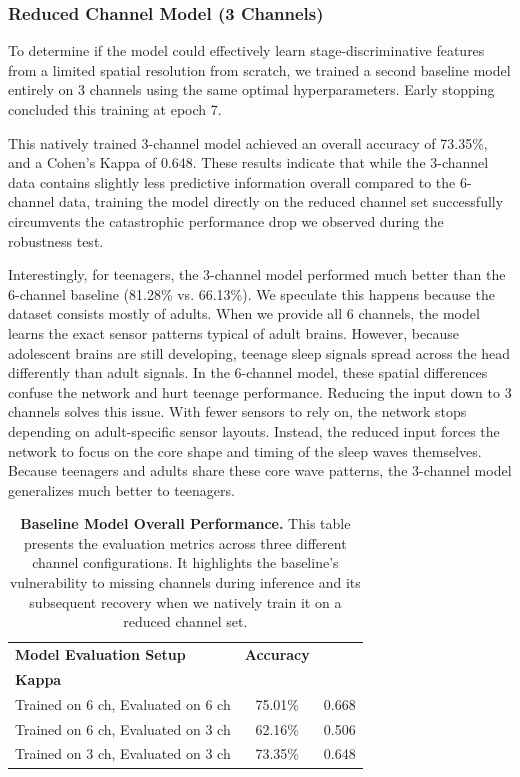 \subsubsection*{Reduced Channel Model (3 Channels)}
To determine if the model could effectively learn stage-discriminative features from a limited spatial resolution from scratch, we trained a second baseline model entirely on 3 channels using the same optimal hyperparameters. Early stopping concluded this training at epoch 7.

This natively trained 3-channel model achieved an overall accuracy of 73.35\%, and a Cohen's Kappa of 0.648. These results indicate that while the 3-channel data contains slightly less predictive information overall compared to the 6-channel data, training the model directly on the reduced channel set successfully circumvents the catastrophic performance drop we observed during the robustness test.

Interestingly, for teenagers, the 3-channel model performed much better than the 
6-channel baseline (81.28\% vs. 66.13\%). We speculate this happens because the 
dataset consists mostly of adults. 
When we provide all 6 channels, the model learns the exact sensor patterns typical of 
adult brains. However, because adolescent brains are still developing, teenage sleep 
signals spread across the head differently than adult signals. In the 6-channel model, 
these spatial differences confuse the network and hurt teenage performance.
Reducing the input down to 3 channels solves this issue. With fewer sensors to rely on, 
the network stops depending on adult-specific sensor layouts. Instead, the reduced input 
forces the network to focus on the core shape and timing of the sleep waves themselves. 
Because teenagers and adults share these core wave patterns, the 3-channel model generalizes 
much better to teenagers.
\begin{table}[ht]
\centering
\caption{\textbf{Baseline Model Overall Performance.} This table presents the evaluation metrics across three different channel configurations. It highlights the baseline's vulnerability to missing channels during inference and its subsequent recovery when we natively train it on a reduced channel set.}
\label{tab:overall_results}
\begin{tabular}{l c c}
\toprule
\textbf{Model Evaluation Setup} & \textbf{Accuracy} & \makecell[c]{\textbf{Cohen's}\\\textbf{Kappa}} \\
\midrule
Trained on 6 ch, Evaluated on 6 ch & 75.01\% & 0.668 \\
Trained on 6 ch, Evaluated on 3 ch & 62.16\% & 0.506 \\
Trained on 3 ch, Evaluated on 3 ch & 73.35\% & 0.648 \\
\bottomrule
\end{tabular}
\end{table}

